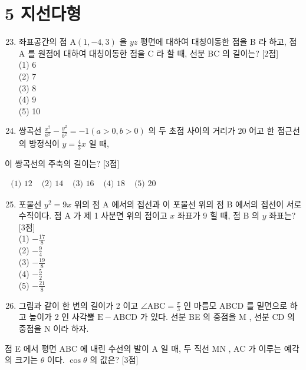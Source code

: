 \documentclass[10pt]{article}
\begin{document}
\section*{5 지선다형}
\begin{enumerate}
  \setcounter{enumi}{22}
  \item 좌표공간의 점 \(\mathrm{A}(1,-4,3)\) 을 \(y z\) 평면에 대하여 대칭이동한 점을 B 라 하고, 점 A 를 원점에 대하여 대칭이동한 점을 C 라 할 때, 선분 BC 의 길이는? [2점]\\
(1) 6\\
(2) 7\\
(3) 8\\
(4) 9\\
(5) 10

  \item 쌍곡선 \(\frac{x^{2}}{a^{2}}-\frac{y^{2}}{b^{2}}=-1(a>0, b>0)\) 의 두 초점 사이의 거리가 20 어고 한 점근선의 방정식이 \(y=\frac{4}{3} x\) 일 때,

\end{enumerate}

이 쌍곡선의 주축의 길이는? [3점]

\(\begin{array}{lllll}\text { (1) } 12 & \text { (2) } 14 & \text { (3) } 16 & \text { (4) } 18 & \text { (5) } 20\end{array}\)

\begin{enumerate}
  \setcounter{enumi}{24}
  \item 포물선 \(y^{2}=9 x\) 위의 점 A 에서의 접선과 이 포물선 위의 점 B 에서의 접선이 서로 수직이다. 점 A 가 제 1 사분면 위의 점이고 \(x\) 좌표가 9 힐 때, 점 B 의 \(y\) 좌표는? [3점]\\
(1) \(-\frac{17}{8}\)\\
(2) \(-\frac{9}{4}\)\\
(3) \(-\frac{19}{8}\)\\
(4) \(-\frac{5}{2}\)\\
(5) \(-\frac{21}{8}\)

  \item 그림과 같이 한 변의 길이가 2 이고 \(\angle \mathrm{ABC}=\frac{\pi}{3}\) 인 마름모 ABCD 를 밑면으로 하고 높이가 2 인 사각뿔 \(\mathrm{E}-\mathrm{ABCD}\) 가 있다. 선분 BE 의 중점을 M , 선분 CD 의 중점을 N 이라 하자.

\end{enumerate}

점 E 에서 평면 ABC 에 내린 수선의 발이 A 일 매, 두 직선 MN , AC 가 이루는 예각의 크기는 \(\theta\) 이다. \(\cos \theta\) 의 값은? [3점]
\end{document}
